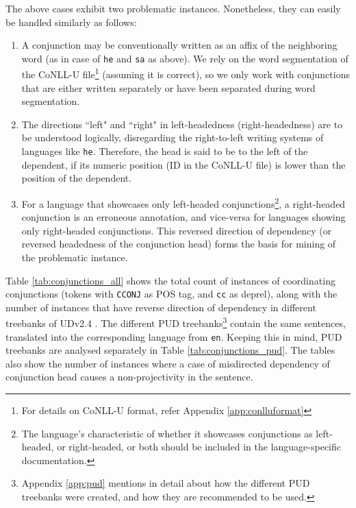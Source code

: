 The above cases exhibit two problematic instances. Nonetheless, they can easily be handled similarly as follows:

\begin{enumerate}
\item A conjunction may be conventionally written as an affix of the neighboring word (as in case of \verb|he| and \verb|sa| as above). We rely on the word segmentation of the CoNLL-U file\footnote{For details on CoNLL-U format, refer Appendix \ref{app:conlluformat}} (assuming it is correct), so we only work with conjunctions that are either written separately or have been separated during word segmentation.

\item The directions ``left" and ``right" in left-headedness (right-headedness) are to be understood logically, disregarding the right-to-left writing systems of languages like \verb|he|. Therefore, the head is said to be to the left of the dependent, if its numeric position (ID in the CoNLL-U file) is lower than the position of the dependent. 

\item For a language that showcases only left-headed conjunctions\footnote{The language's characteristic of whether it showcases conjunctions as left-headed, or right-headed, or both should be included in the language-specific documentation.}, a right-headed conjunction is an erroneous annotation, and vice-versa for languages showing only right-headed conjunctions. This reversed direction of dependency (or reversed headedness of the conjunction head) forms the basis for mining of the problematic instance.
\end{enumerate}

Table \ref{tab:conjunctions_all} shows the total count of instances of coordinating conjunctions (tokens with \verb|CCONJ| as POS tag, and \verb|cc| as deprel), along with the number of instances that have reverse direction of dependency in different treebanks of UDv2.4 \citep{UDv2.4}. The different PUD treebanks\footnote{Appendix \ref{app:pud} mentions in detail about how the different PUD treebanks were created, and how they are recommended to be used.} contain the same sentences, translated into the corresponding language from \verb|en|. Keeping this in mind, PUD treebanks are analysed separately in Table \ref{tab:conjunctions_pud}. The tables also show the number of instances where a case of misdirected dependency of conjunction head causes a non-projectivity in the sentence.

